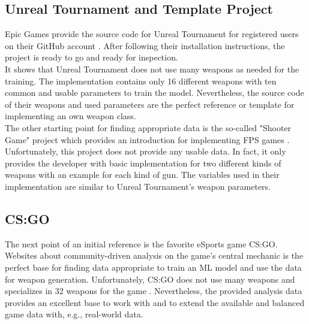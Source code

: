 \documentclass[MGS,Master,english]{twbook}%
\begin{document}
\subsection{Unreal Tournament and Template Project}
Epic Games provide the source code for Unreal Tournament for registered users on their GitHub account \cite{epicGames::unrealTournamentSourceCode}. After following their installation instructions, the project is ready to go and ready for inspection.\\
It shows that Unreal Tournament does not use many weapons as needed for the training. The implementation contains only 16 different weapons with ten common and usable parameters to train the model. Nevertheless, the source code of their weapons and used parameters are the perfect reference or template for implementing an own weapon class.\\
The other starting point for finding appropriate data is the so-called "Shooter Game" project which provides an introduction for implementing FPS games \cite{epicGames::shooterGame}. Unfortunately, this project does not provide any usable data. In fact, it only provides the developer with basic implementation for two different kinds of weapons with an example for each kind of gun. The variables used in their implementation are similar to Unreal Tournament’s weapon parameters.

\subsection{\acl{CS:GO}}
The next point of an initial reference is the favorite eSports game \ac{CS:GO}. Websites about community-driven analysis on the game's central mechanic is the perfect base for finding data appropriate to train an ML model and use the data for weapon generation. Unfortunately, CS:GO does not use many weapons and specializes in 32 weapons for the game \cite{counterstrike::wikiWeapons}. Nevertheless, the provided analysis data provides an excellent base to work with and to extend the available and balanced game data with, e.g., real-world data.
\end{document}
